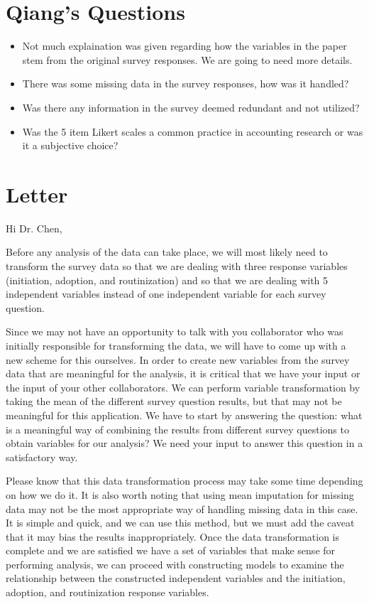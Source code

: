 \section{Qiang's Questions}
\begin{itemize}
\item Not much explaination was given regarding how the variables in the paper stem from the original survey responses. We are going to need more details.
\item There was some missing data in the survey responses, how was it handled?
\item Was there any information in the survey deemed redundant and not utilized?
\item Was the 5 item Likert scales a common practice in accounting research or was it a subjective choice?
\end{itemize}



\section{Letter}

Hi Dr. Chen,

Before any analysis of the data can take place, we will most likely need to transform the survey data so that we are dealing with three response variables (initiation, adoption, and routinization) and so that we are dealing with 5 independent variables instead of one independent variable for each survey question. 

Since we may not have an opportunity to talk with you collaborator who was initially responsible for transforming the data, we will have to come up with a new scheme for this ourselves. In order to create new variables from the survey data that are meaningful for the analysis, it is critical that we have your input or the input of your other collaborators. We can perform variable transformation by taking the mean of the different survey question results, but that may not be meaningful for this application. We have to start by answering the question: what is a meaningful way of combining the results from different survey questions to obtain variables for our analysis? We need your input to answer this question in a satisfactory way.

Please know that this data transformation process may take some time depending on how we do it. It is also worth noting that using mean imputation for missing data may not be the most appropriate way of handling missing data in this case. It is simple and quick, and we can use this method, but we must add the caveat that it may bias the results inappropriately. Once the data transformation is complete and we are satisfied we have a set of variables that make sense for performing analysis, we can proceed with constructing models to examine the relationship between the constructed independent variables and the initiation, adoption, and routinization response variables. 

